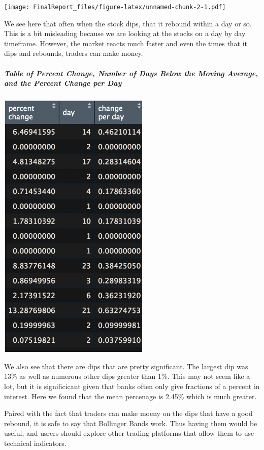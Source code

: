 \documentclass[]{article}
\let\oldsubparagraph\subparagraph
\renewcommand{\subparagraph}[1]{\oldsubparagraph{#1}\mbox{}}
\begin{document}
\texttt{[image: FinalReport\_files/figure-latex/unnamed-chunk-2-1.pdf]}

We see here that often when the stock dips, that it rebound within a day
or so. This is a bit misleading because we are looking at the stocks on
a day by day timeframe. However, the market reacts much faster and even
the times that it dips and rebounds, traders can make money.

\hypertarget{table-of-percent-change-number-of-days-below-the-moving-average-and-the-percent-change-per-day}{%
\subparagraph{Table of Percent Change, Number of Days Below the Moving
Average, and the Percent Change per
Day}\label{table-of-percent-change-number-of-days-below-the-moving-average-and-the-percent-change-per-day}}

\includegraphics{BBandTable.png}

We also see that there are dips that are pretty significant. The largest
dip was 13\% as well as numerous other dips greater than 1\%. This may
not seem like a lot, but it is significicant given that banks often only
give fractions of a percent in interest. Here we found that the mean
percenage is 2.45\% which is much greater.

Paired with the fact that traders can make moeny on the dips that have a
good rebound, it is safe to say that Bollinger Bands work. Thus having
them would be useful, and usrers should explore other trading platforms
that allow them to use technical indicators.
\end{document}

